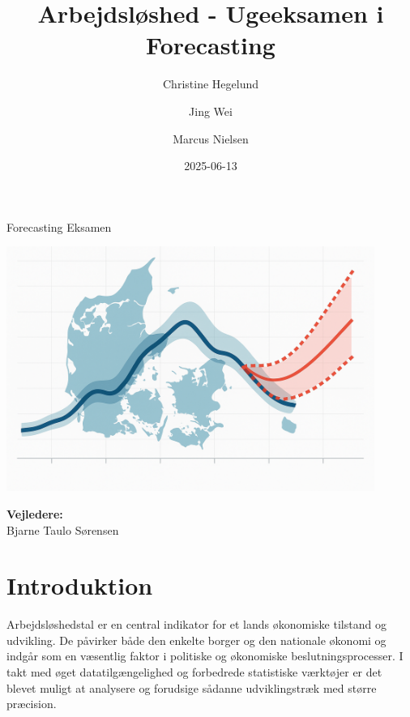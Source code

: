 \documentclass[
]{article}
\title{Arbejdsløshed - Ugeeksamen i Forecasting}
\author{Christine Hegelund \and Jing Wei \and Marcus Nielsen}
\date{2025-06-13}
\begin{document}
\maketitle


\maketitle
\thispagestyle{empty}
\begin{center}
\large{Forecasting Eksamen} \\[3em]
\end{center}
\begin{center}
\includegraphics[width=0.9\textwidth]{fotos/forside.png} \\[2em]
\end{center}
\begin{center}
\end{center}
\begin{center}
\textbf{Vejledere:} \\
Bjarne Taulo Sørensen \\
\end{center}

\newpage

\tableofcontents

\setcounter{page}{1}
\newpage

\section{Introduktion}\label{introduktion}

Arbejdsløshedstal er en central indikator for et lands økonomiske
tilstand og udvikling. De påvirker både den enkelte borger og den
nationale økonomi og indgår som en væsentlig faktor i politiske og
økonomiske beslutningsprocesser. I takt med øget datatilgængelighed og
forbedrede statistiske værktøjer er det blevet muligt at analysere og
forudsige sådanne udviklingstræk med større præcision.
\end{document}
